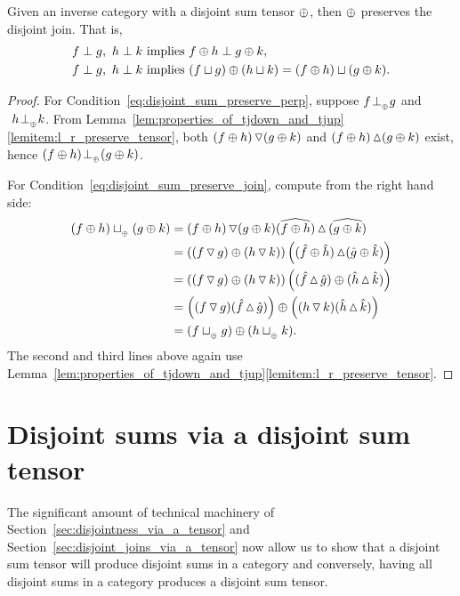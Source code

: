 \begin{lemma}\label{lem:disjoint_sum_tensor_preserves_the_disjoint_join}
  Given an inverse category \X with a disjoint sum tensor $\oplus$, then $\oplus$ preserves the disjoint
  join. That is,
  \begin{align}
    f \perp g, \ h \perp k&\text{ implies } f\oplus h \perp g \oplus k,
    \label{eq:disjoint_sum_preserve_perp}\\
    f \perp g, \ h \perp k &\text{ implies } (f\sqcup g)\oplus(h\sqcup k) = (f \oplus h )\sqcup (g\oplus k).
    \label{eq:disjoint_sum_preserve_join}
  \end{align}
\end{lemma}
\begin{proof}
  For Condition~\ref{eq:disjoint_sum_preserve_perp}, suppose  $f {}_{{}_{}}{\perp_{{}_{\oplus}}} g$ and $\ h {}_{{}_{}}{\perp_{{}_{\oplus}}} k$.
  From Lemma~\ref{lem:properties_of_tjdown_and_tjup}\ref{lemitem:l_r_preserve_tensor},
  both $(f\oplus h)\operatorname{\triangledown}(g\oplus k)$ and $(f\oplus h)\operatorname{\vartriangle}(g\oplus k)$ exist, hence $(f\oplus h){}_{{}_{}}{\perp_{{}_{\oplus}}}(g\oplus k)$.

  For Condition~\ref{eq:disjoint_sum_preserve_join}, compute from the right hand side:
  \begin{align*}
    (f\oplus h)\sqcup_{{_{\oplus}}}(g\oplus k) &= (f\oplus h)\operatorname{\triangledown} (g\oplus k) \widehat{(f\oplus h)}\operatorname{\vartriangle} \widehat{(g\oplus k)}\\
    &= \left( (f\operatorname{\triangledown} g)\oplus (h \operatorname{\triangledown} k) \right)
       \left( (\hat{f}\oplus\hat{h}) \operatorname{\vartriangle} (\hat{g}\oplus\hat{k}) \right) \\
    &= \left( (f\operatorname{\triangledown} g)\oplus (h \operatorname{\triangledown} k) \right)
       \left( (\hat{f}\operatorname{\vartriangle} \hat{g}) \oplus (\hat{h}\operatorname{\vartriangle}\hat{k}) \right) \\
    &= \left( (f\operatorname{\triangledown} g)(\hat{f}\operatorname{\vartriangle} \hat{g})\right) \oplus
       \left((h \operatorname{\triangledown} k) (\hat{h}\operatorname{\vartriangle}\hat{k}) \right) \\
    &=  (f\sqcup_{{_{\oplus}}} g)\oplus(h \sqcup_{{_{\oplus}}} k).
  \end{align*}
  The second and third lines above again use
  Lemma~\ref{lem:properties_of_tjdown_and_tjup}\ref{lemitem:l_r_preserve_tensor}.

\end{proof}
\section{Disjoint sums via a disjoint sum tensor}
\label{sec:disjoint-sums-via-a-disjoint-sum-tensor}

The significant amount of technical machinery of Section~\ref{sec:disjointness_via_a_tensor} and
Section~\ref{sec:disjoint_joins_via_a_tensor} now allow us to show that a disjoint sum tensor will
produce disjoint sums in a category and conversely, having all disjoint sums in a category produces
a disjoint sum tensor.

